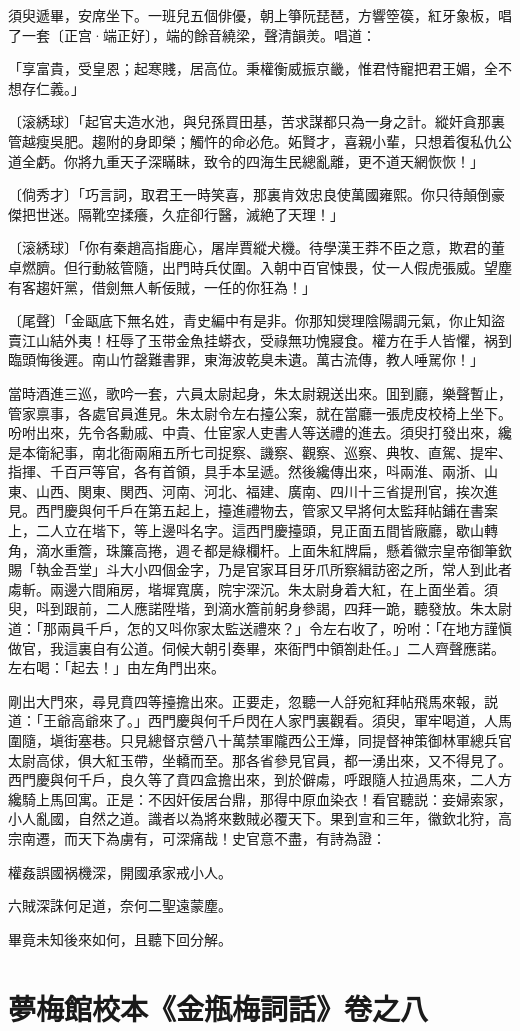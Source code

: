 須臾遞畢，安席坐下。一班兒五個俳優，朝上箏阮琵琶，方響箜篌，紅牙象板，唱了一套〔正宫·端正好〕，端的餘音繞梁，聲清韻羙。唱道：

\begin{myquote}
「享富貴，受皇恩；起寒賤，居高位。秉權衡威振京畿，惟君恃寵把君王媚，全不想存仁義。」

{\markfont〔滚綉球〕}「起官夫造水池，與兒孫買田基，苦求謀都只為一身之計。縱奸貪那裏管越瘦吳肥。趨附的身即榮；觸忤的命必危。妬賢才，喜親小輩，只想着復私仇公道全虧。你將九重天子深瞞眛，致令的四海生民總亂離，更不道天網恢恢！」

{\markfont〔倘秀才〕}「巧言詞，取君王一時笑喜，那裏肯效忠良使萬國雍熙。你只待顛倒豪傑把世迷。隔靴空揉癢，久症卻行醫，滅絶了天理！」

{\markfont〔滚綉球〕}「你有秦趙高指鹿心，屠岸賈縱犬機。待學漢王莽不臣之意，欺君的董卓燃臍。但行動絃管隨，出門時兵仗圍。入朝中百官悚畏，仗一人假虎張威。望塵有客趨奸黨，借劍無人斬佞賊，一任的你狂為！」

{\markfont〔尾聲〕}「金甌底下無名姓，青史編中有是非。你那知爕理陰陽調元氣，你止知盜賣江山結外夷！枉辱了玉带金魚挂蟒衣，受祿無功愧寢食。權方在手人皆懼，祸到臨頭悔後遲。南山竹罄難書罪，東海波乾臭未遺。萬古流傳，教人唾駡你！」
\end{myquote}

當時酒進三巡，歌吟一套，六員太尉起身，朱太尉親送出來。囬到廳，樂聲暫止，管家禀事，各處官員進見。朱太尉令左右擡公案，就在當廳一張虎皮校椅上坐下。吩咐出來，先令各勳戚、中貴、仕宦家人吏書人等送禮的進去。須臾打發出來，纔是本衛紀事，南北衙兩廂五所七司捉察、譏察、觀察、巡察、典牧、直駕、提牢、指揮、千百戸等官，各有首領，具手本呈遞。然後纔傳出來，呌兩淮、兩浙、山東、山西、関東、関西、河南、河北、福建、廣南、四川十三省提刑官，挨次進見。西門慶與何千戶在第五起上，擡進禮物去，管家又早將何太監拜帖鋪在書案上，二人立在堦下，等上邊呌名字。這西門慶擡頭，見正面五間皆廠廳，歇山轉角，滴水重簷，珠簾高捲，週そ都是綠欄杆。上面朱紅牌扁，懸着徽宗皇帝御筆欽賜「執金吾堂」斗大小四個金字，乃是官家耳目牙爪所察緝訪密之所，常人到此者䖏斬。兩邊六間廂房，堦墀寬廣，院宇深沉。朱太尉身着大紅，在上面坐着。須臾，呌到跟前，二人應諾陞堦，到滴水簷前躬身參謁，四拜一跪，聽發放。朱太尉道：「那兩員千戶，怎的又呌你家太監送禮來？」令左右收了，吩咐：「在地方謹愼做官，我這裏自有公道。伺候大朝引奏畢，來衙門中領劄赴任。」二人齊聲應諾。左右喝：「起去！」由左角門出來。

剛出大門來，尋見賁四等擡擔出來。正要走，忽聽一人㧱宛紅拜帖飛馬來報，説道：「王爺高爺來了。」西門慶與何千戶閃在人家門裏觀看。須臾，軍牢喝道，人馬圍隨，塡街塞巷。只見總督京營八十萬禁軍隴西公王燁，同提督神策御林軍總兵官太尉高俅，俱大紅玉帶，坐轎而至。那各省參見官員，都一湧出來，又不得見了。西門慶與何千戶，良久等了賁四盒擔出來，到於僻䖏，呼跟隨人拉過馬來，二人方纔騎上馬回寓。正是：不因奸佞居台鼎，那得中原血染衣！看官聽説：妾婦索家，小人亂國，自然之道。識者以為將來數賊必覆天下。果到宣和三年，徽欽北狩，高宗南遷，而天下為虜有，可深痛哉！史官意不盡，有詩為證：

\begin{myquote}
權姦誤國祸機深，開國承家戒小人。

六賊深誅何足道，奈何二聖遠蒙塵。
\end{myquote}

畢竟未知後來如何，且聽下回分解。

\part*{夢梅館校本《金瓶梅詞話》卷之八}

